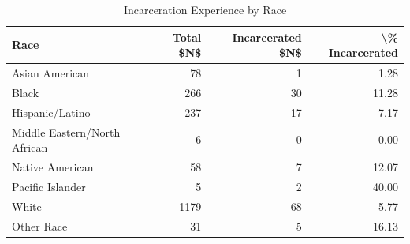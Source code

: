 \begin{table}

\caption{Incarceration Experience by Race}
\centering
\begin{tabular}[t]{lrrr}
\toprule
Race & Total \$N\$ & Incarcerated \$N\$ & \textbackslash{}\% Incarcerated\\
\midrule
Asian American & 78 & 1 & 1.28\\
Black & 266 & 30 & 11.28\\
Hispanic/Latino & 237 & 17 & 7.17\\
Middle Eastern/North African & 6 & 0 & 0.00\\
Native American & 58 & 7 & 12.07\\
\addlinespace
Pacific Islander & 5 & 2 & 40.00\\
White & 1179 & 68 & 5.77\\
Other Race & 31 & 5 & 16.13\\
\bottomrule
\end{tabular}
\end{table}
